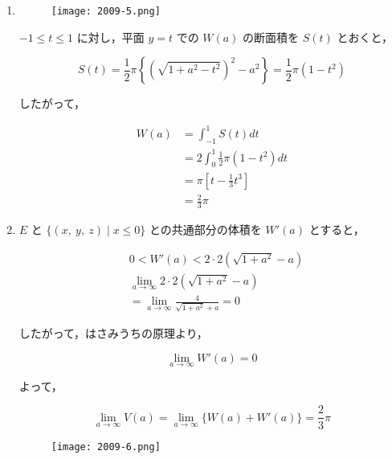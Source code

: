 \documentclass[a4paper]{ltjsarticle}
\begin{document}
\begin{enumerate}[label=(\arabic*)]
    \item
          \begin{figure}[!ht]
              \centering
              \texttt{[image: 2009-5.png]}
          \end{figure}

          $-1\leq t\leq 1$ に対し，平面 $y=t$ での $W(a)$ の断面積を $S(t)$ とおくと，

          \begin{equation*}
              S(t)=\frac{1}{2}\pi\left\{(\sqrt{1+a^2-t^2})^2-a^2\right\}=\frac{1}{2}\pi(1-t^2)
          \end{equation*}

          したがって，

          \begin{align*}
              W(a) & =\int_{-1}^{1}S(t)dt                  \\
                   & =2\int_{0}^{1}\frac{1}{2}\pi(1-t^2)dt \\
                   & =\pi\left[t-\frac{1}{3}t^3\right]     \\
                   & =\frac{2}{3}\pi
          \end{align*}

    \item $E$ と $\{(x,\ y,\ z)\mid x\leq 0\}$ との共通部分の体積を $W'(a)$ とすると，

          \begin{align*}
               & 0<W'(a)<2\cdot 2(\sqrt{1+a^2}-a)             \\
               & \lim_{a\to\infty}2\cdot 2(\sqrt{1+a^2}-a)    \\
               & =\lim_{a\to\infty}\frac{4}{\sqrt{1+a^2}+a}=0
          \end{align*}

          したがって，はさみうちの原理より，

          \begin{equation*}
              \lim_{a\to\infty}W'(a)=0
          \end{equation*}

          よって，

          \begin{equation*}
              \lim_{a\to\infty}V(a)=\lim_{a\to\infty}\{W(a)+W'(a)\}=\frac{2}{3}\pi
          \end{equation*}

          \begin{figure}[!ht]
              \centering
              \texttt{[image: 2009-6.png]}
          \end{figure}


\end{enumerate}
\end{document}
